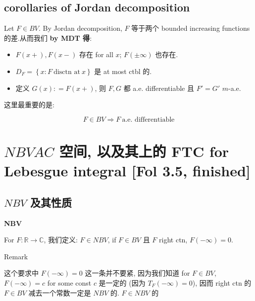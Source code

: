 \documentclass{qlnotes-export}
\begin{document}
\subsection{corollaries of Jordan decomposition}\label{corollaries-of-jordan-decomposition}

\begin{corollary}

Let \(F \in BV\). By Jordan decomposition, \(F\) 等于两个 bounded increasing functions 的差.从而我们 \textbf{by MDT 得}:

\begin{itemize}
\item
  \(F(x + ),F(x - )\) 存在 for all \(x\); \(F( \pm \infty)\) 也存在.
\item
  \(D_{F} = \left\{ {x:F\ \text{disctn at}\ x} \right\}\) 是 at most ctbl 的.
\item
  定义 \(G(x): = F(x + )\), 则 \(F,G\) 都 a.e. differentiable 且 \(F' = G'\) \(m\)-a.e.
\end{itemize}

\end{corollary}

这里最重要的是:

\[F \in BV\Longrightarrow F\ \text{a.e. differentiable}\]

\section{\texorpdfstring{\(NBV AC\) 空间, 以及其上的 FTC for Lebesgue integral {[}Fol 3.5, finished{]}}{NBV AC 空间, 以及其上的 FTC for Lebesgue integral {[}Fol 3.5, finished{]}}}

\subsection{\texorpdfstring{\(NBV\) 及其性质}{NBV 及其性质}}\label{nbv-ux53caux5176ux6027ux8d28}

\begin{definition}{\protect{}\label{kn-nbv}{\textbf{NBV}}}

For \(F:{\mathbb{R}}\rightarrow{\mathbb{C}}\), 我们定义: \(F \in NBV\), if \(F \in BV\) 且 \(F\) right ctn, \(F( - \infty) = 0\).

\end{definition}

\begin{qlremark}{Remark}

这个要求中 \(F( - \infty) = 0\) 这一条并不要紧, 因为我们知道 for \(F \in BV\), \(F( - \infty) = c\) for some const \(c\) 是一定的 (因为 \(T_{F}( - \infty) = 0\)), 因而 right ctn 的 \(F \in BV\) 减去一个常数一定是 \(NBV\) 的. \(F \in NBV\) 的

\end{qlremark}
\end{document}
